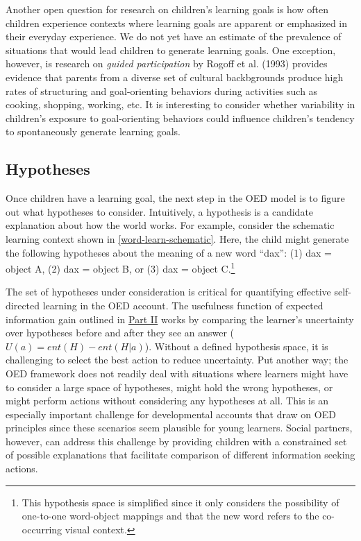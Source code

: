 \documentclass[oneside]{report}
\begin{document}
Another open question for research on children's learning goals is how
often children experience contexts where learning goals are apparent or
emphasized in their everyday experience. We do not yet have an estimate
of the prevalence of situations that would lead children to generate
learning goals. One exception, however, is research on \emph{guided
participation} by Rogoff et al. (1993) provides evidence that parents
from a diverse set of cultural backbgrounds produce high rates of
structuring and goal-orienting behaviors during activities such as
cooking, shopping, working, etc. It is interesting to consider whether
variability in children's exposure to goal-orienting behaviors could
influence children's tendency to spontaneously generate learning goals.

\subsection{Hypotheses}\label{hypotheses}

Once children have a learning goal, the next step in the OED model is to
figure out what hypotheses to consider. Intuitively, a hypothesis is a
candidate explanation about how the world works. For example, consider
the schematic learning context shown in \ref{word-learn-schematic}.
Here, the child might generate the following hypotheses about the
meaning of a new word ``dax'': (1) dax = object A, (2) dax = object B,
or (3) dax = object C.\footnote{This hypothesis space is simplified
  since it only considers the possibility of one-to-one word-object
  mappings and that the new word refers to the co-occurring visual
  context.}

The set of hypotheses under consideration is critical for quantifying
effective self-directed learning in the OED account. The usefulness
function of expected information gain outlined in
\protect\hyperlink{oed}{Part II} works by comparing the learner's
uncertainty over hypotheses before and after they see an answer
(\(U(a) = ent(H) - ent(H|a)\)). Without a defined hypothesis space, it
is challenging to select the best action to reduce uncertainty. Put
another way; the OED framework does not readily deal with situations
where learners might have to consider a large space of hypotheses, might
hold the wrong hypotheses, or might perform actions without considering
any hypotheses at all. This is an especially important challenge for
developmental accounts that draw on OED principles since these scenarios
seem plausible for young learners. Social partners, however, can address
this challenge by providing children with a constrained set of possible
explanations that facilitate comparison of different information seeking
actions.
\end{document}
